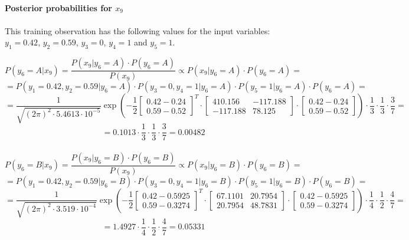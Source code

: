 \documentclass{article}
\begin{document}
\paragraph{Posterior probabilities for $x_9$}
\paragraph{}

This training observation has the following values for the input variables: $y_1=0.42$, $y_2=0.59$, $y_3=0$, $y_4=1$ and $y_5=1$.

\[ P(y_6=A|x_9) = \frac{P(x_9|y_6=A) \cdot P(y_6=A)}{P(x_9)} \propto P(x_9|y_6=A) \cdot P(y_6=A) = \]
\[ = P(y_1=0.42,y_2=0.59|y_6=A) \cdot P(y_3=0,y_4=1|y_6=A) \cdot P(y_5=1|y_6=A) \cdot P(y_6=A) = \]
\[ = \frac{1}{\sqrt{(2\pi)^2 \cdot 5.4613 \cdot 10^{-5}}} \exp \left( -\frac{1}{2} \left[ \begin{matrix} 0.42 - 0.24 \\ 0.59 - 0.52 \end{matrix} \right]^T \cdot \begin{bmatrix} 410.156 & -117.188 \\ -117.188 & 78.125 \end{bmatrix} \cdot \left[ \begin{matrix} 0.42 - 0.24 \\ 0.59 - 0.52 \end{matrix} \right] \right) \cdot \frac{1}{3} \cdot \frac{1}{3} \cdot \frac{3}{7} = \]
\[ = 0.1013 \cdot \frac{1}{3} \cdot \frac{1}{3} \cdot \frac{3}{7} = 0.00482 \]

\paragraph{}

\[ P(y_6=B|x_9) = \frac{P(x_9|y_6=B) \cdot P(y_6=B)}{P(x_9)} \propto P(x_9|y_6=B) \cdot P(y_6=B) = \]
\[ = P(y_1=0.42,y_2=0.59|y_6=B) \cdot P(y_3=0,y_4=1|y_6=B) \cdot P(y_5=1|y_6=B) \cdot P(y_6=B) = \]
\[ = \frac{1}{\sqrt{(2\pi)^2 \cdot 3.519 \cdot 10^{-4}}} \exp \left( -\frac{1}{2} \left[ \begin{matrix} 0.42 - 0.5925 \\ 0.59 - 0.3274 \end{matrix} \right]^T \cdot \begin{bmatrix} 67.1101 & 20.7954 \\ 20.7954 & 48.7831 \end{bmatrix} \cdot \left[ \begin{matrix} 0.42 - 0.5925 \\ 0.59 - 0.3274 \end{matrix} \right] \right) \cdot \frac{1}{4} \cdot \frac{1}{2} \cdot \frac{4}{7} = \]
\[ = 1.4927 \cdot \frac{1}{4} \cdot \frac{1}{2} \cdot \frac{4}{7} = 0.05331 \]
\end{document}
